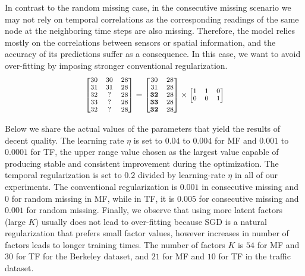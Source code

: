 In contrast to the random missing case, in the consecutive missing scenario we may not rely on temporal correlations as the corresponding readings of the same node at the neighboring time steps are also missing.
Therefore, the model relies mostly on the correlations between sensors or spatial information, and the accuracy of its predictions suffer as a consequence.
In this case, we want to avoid over-fitting by imposing stronger conventional regularization.
\begin{equation}
\small
\label{temporalSplit_matrix}
\begin{bmatrix}
30 & 30 & 28\\
31 & 31 & 28\\
32 &  ? & 28\\
33 &  ? & 28\\
32 &  ? & 28\\
\end{bmatrix} 
= 
\begin{bmatrix}
30 & 28\\
31 & 28\\
\mathbf{32} & 28\\
\mathbf{33} & 28\\
\mathbf{32} & 28\\
\end{bmatrix} 
\times
\begin{bmatrix}
1 & 1 & 0\\
0 & 0 & 1\\
\end{bmatrix} 
\end{equation}

Below we share the actual values of the parameters that yield the results of decent quality.
The learning rate $\eta$ is set to $0.04$ to $0.004$ for MF and $0.001$ to $0.0001$ for TF, the upper range value chosen as the largest value capable of producing stable and consistent improvement during the optimization.
The temporal regularization is set to $0.2$ divided by learning-rate $\eta$ in all of our experiments.
The conventional regularization is $0.001$ in consecutive missing and $0$ for random missing in MF, while in TF, it is $0.005$ for consecutive missing and $0.001$ for random missing.
Finally, we observe that using more latent factors (large $K$) usually does not lead to over-fitting because SGD is a natural regularization that prefers small factor values, however increases in number of factors leads to longer training times.
The number of factors $K$ is $54$ for MF and $30$ for TF for the Berkeley dataset, and $21$ for MF and $10$ for TF in the traffic dataset. 

